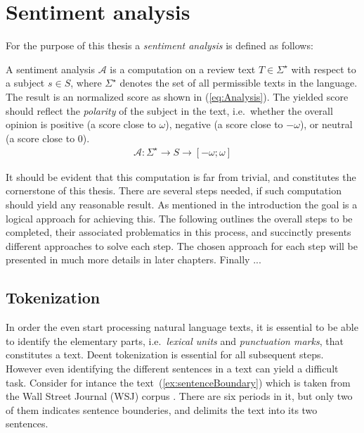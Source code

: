 
\chapter{Sentiment analysis}

For the purpose of this thesis a \emph{sentiment analysis} is defined as follows:
\begin{definition}
A sentiment analysis $\mathcal{A}$ is a computation on a review text $T \in \Sigma^\star$ with respect to a subject $s \in S$, where $\Sigma^\star$ denotes the set of all permissible texts in the language. The result is an normalized score as shown in (\ref{eq:Analysis}). The yielded score should reflect the \emph{polarity} of the subject in the text, i.e.\ whether the overall opinion is positive (a score close to $\omega$), negative (a score close to $-\omega$), or neutral (a score close to $0$).
  \begin{align}
	 \mathcal{A}: \Sigma^\star \to S \to [-\omega;\omega]
	 \label{eq:Analysis}
  \end{align}
\end{definition}

 It should be evident that this computation is far from trivial, and constitutes the cornerstone of this thesis. There are several steps needed, if such computation should yield any reasonable result. As mentioned in the introduction the goal is a logical approach for achieving this. The following outlines the overall steps to be completed, their associated problematics in this process, and succinctly presents different approaches to solve each step. The chosen approach for each step will be presented in much more details in later chapters. Finally ... 

\clearpage

\section{Tokenization}
In order the even start processing natural language texts, it is essential to be able to identify the elementary parts, i.e.\ \emph{lexical units} and \emph{punctuation marks}, that constitutes a text. Deent tokenization is essential for all subsequent steps. However even identifying the different sentences in a text can yield a difficult task. Consider for intance the text~(\ref{ex:sentenceBoundary}) which is taken from the Wall Street Journal (WSJ) corpus \cite{wsjCorpus}. There are six periods in it, but only two of them indicates sentence bounderies, and delimits the text into its two sentences.

